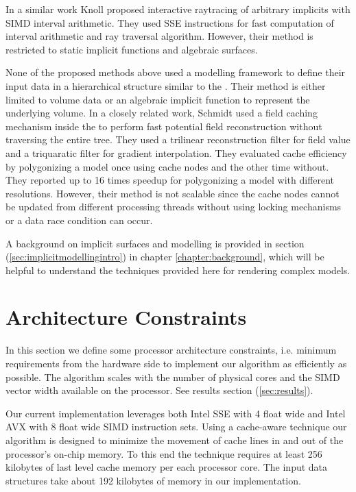 In a similar work Knoll \etal \cite{Knoll2007} proposed interactive raytracing of arbitrary implicits with 
SIMD interval arithmetic. They used SSE instructions for fast computation of interval arithmetic 
and ray traversal algorithm. However, their method is restricted to static implicit functions and 
algebraic surfaces.

None of the proposed methods above used a modelling framework to define their input data in a hierarchical structure similar to 
the \blobns. Their method is either limited to volume data or an algebraic implicit function to represent the underlying volume. 
In a closely related work, Schmidt \etal \cite{SWG2005} used a field caching mechanism inside the \blob to perform fast potential field 
reconstruction without traversing the entire tree. They used a trilinear reconstruction filter for field value and a triquaratic filter
for gradient interpolation. They evaluated cache efficiency by polygonizing a \blob model once using cache nodes and the other time 
without. They reported up to 16 times speedup for polygonizing a model with different resolutions. However, their method is not scalable since 
the cache nodes cannot be updated from different processing threads without using locking
mechanisms or a data race condition can occur. 

A background on implicit surfaces and \blob modelling is provided in section (\ref{sec:implicitmodellingintro}) in chapter \ref{chapter:background},
which will be helpful to understand the techniques provided here for rendering complex \blob models.
\section{Architecture Constraints}\label{sec:architecture}
In this section we define some processor architecture constraints, i.e. minimum 
requirements from the hardware side to implement our algorithm as efficiently as possible.
The algorithm scales with the number of physical cores and the SIMD vector width available on the processor.  
See results section (\ref{sec:results}). 

Our current implementation leverages both Intel SSE with 4 float wide and Intel AVX with 8 float wide SIMD instruction sets.
Using a cache-aware technique our algorithm is designed to minimize the movement of cache lines in and out of the processor's on-chip 
memory. To this end the technique requires at least 256 kilobytes of last level cache memory per each processor core. 
The input data structures take about 192 kilobytes of memory in our implementation.

